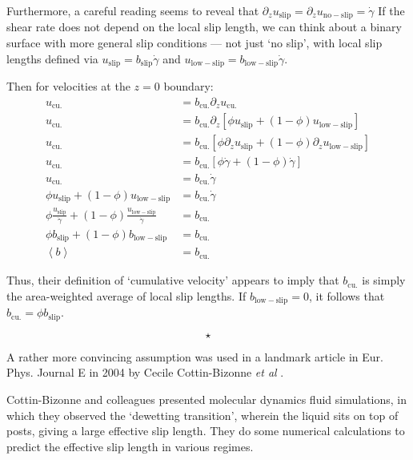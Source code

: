 \documentclass[a4paper]{report}
\newcommand{\sep}{\begin{equation*} \star \end{equation*}}
\begin{document}
Furthermore, a careful reading seems to reveal that 
$ \partial_z u_{\mathrm{slip}} = \partial_z u_{\mathrm{no-slip}} = \dot{\gamma} $
If the shear rate does not depend on the local slip length, we can think about a binary surface with more general slip conditions --- not just `no slip', with local slip lengths defined via
$u_{\mathrm{slip}} = b_{\mathrm{slip}} \dot{\gamma}$ and $u_{\mathrm{low-slip}} = b_{\mathrm{low-slip}} \dot{\gamma}$.

Then for velocities at the $z=0$ boundary:
\begin{align*}
u_{\mathrm{cu.}} & = b_{\mathrm{cu.}} \partial_z u_{\mathrm{cu.}} \\
u_{\mathrm{cu.}} & = b_{\mathrm{cu.}} \partial_z
[ \phi u_{\mathrm{slip}} + (1-\phi) u_{\mathrm{low-slip}} ] \\
u_{\mathrm{cu.}} & = b_{\mathrm{cu.}} 
[ \phi \partial_z u_{\mathrm{slip}} + (1-\phi) \partial_z u_{\mathrm{low-slip}} ] \\
u_{\mathrm{cu.}} & = b_{\mathrm{cu.}} [ \phi \dot{\gamma} + (1-\phi) \dot{\gamma} ]\\
u_{\mathrm{cu.}} & = b_{\mathrm{cu.}} \dot{\gamma}\\
\phi u_{\mathrm{slip}} + (1-\phi) u_{\mathrm{low-slip}} & = b_{\mathrm{cu.}} \dot{\gamma} \\
\phi \frac{u_{\mathrm{slip}}}{\dot{\gamma}} + (1-\phi) \frac{ u_{\mathrm{low-slip}}} {\dot{\gamma}} & = b_{\mathrm{cu.}} \\
\phi b_{\mathrm{slip}} + (1-\phi) b_{\mathrm{low-slip}} & = b_{\mathrm{cu.}} \\
\left< b \right> & = b_{\mathrm{cu.}}
\end{align*}

Thus, their definition of `cumulative velocity' appears to imply that $b_{\mathrm{cu.}}$ is simply the area-weighted average of local slip lengths.  If $b_{\mathrm{low-slip}} = 0$, it follows that 
$ b_{\mathrm{cu.}} = \phi b_{\mathrm{slip}} $.

\sep

A rather more convincing assumption was used in a landmark article in Eur. Phys. Journal E in 2004 by Cecile Cottin-Bizonne \emph{et al} \cite{Cottin-Bizonne2004}.

Cottin-Bizonne and colleagues presented molecular dynamics fluid simulations, in which they observed the `dewetting transition', wherein the liquid sits on top of posts, giving a large effective slip length.  They do some numerical calculations to predict the effective slip length in various regimes.  
\end{document}
